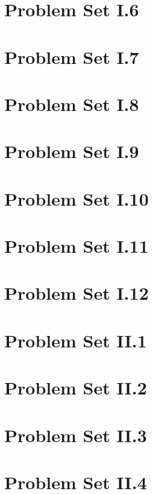 \documentclass{article}
\renewcommand{\(}{\left(}
\renewcommand{\)}{\right)}
\theoremstyle{plain}
\theoremstyle{plain}
\theoremstyle{definition}
\begin{document}
\section{Problem Set I.6}
\section{Problem Set I.7}
\section{Problem Set I.8}
\section{Problem Set I.9}
\section{Problem Set I.10}
\section{Problem Set I.11}
\section{Problem Set I.12}
\section{Problem Set II.1}
\section{Problem Set II.2}
\section{Problem Set II.3}
\section{Problem Set II.4}
\end{document}
